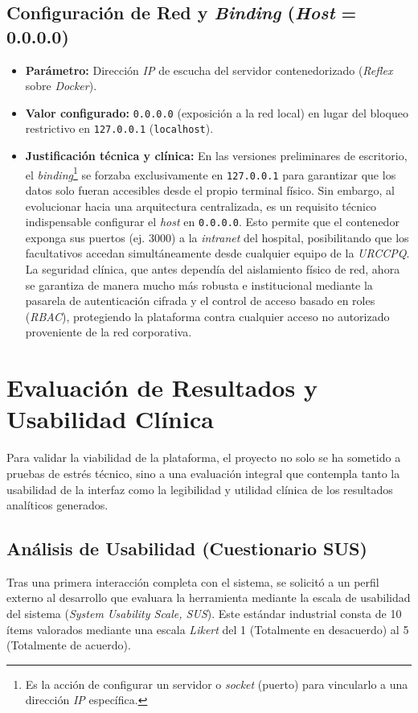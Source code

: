 \subsection{Configuración de Red y \textit{Binding} (\textit{Host} = 0.0.0.0)}
\begin{itemize}
    \item \textbf{Parámetro:} Dirección \textit{IP} de escucha del servidor contenedorizado (\textit{Reflex} sobre \textit{Docker}).
    \item \textbf{Valor configurado:} \texttt{0.0.0.0} (exposición a la red local) en lugar del bloqueo restrictivo en \texttt{127.0.0.1} (\texttt{localhost}).
    \item \textbf{Justificación técnica y clínica:} En las versiones preliminares de escritorio, el \textit{binding}\footnote{Es la acción de configurar un servidor o \textit{socket} (puerto) para vincularlo a una dirección \textit{IP} específica.} se forzaba exclusivamente en \texttt{127.0.0.1} para garantizar que los datos solo fueran accesibles desde el propio terminal físico. Sin embargo, al evolucionar hacia una arquitectura centralizada, es un requisito técnico indispensable configurar el \textit{host} en \texttt{0.0.0.0}. Esto permite que el contenedor exponga sus puertos (ej. 3000) a la \textit{intranet} del hospital, posibilitando que los facultativos accedan simultáneamente desde cualquier equipo de la \textit{URCCPQ}. La seguridad clínica, que antes dependía del aislamiento físico de red, ahora se garantiza de manera mucho más robusta e institucional mediante la pasarela de autenticación cifrada y el control de acceso basado en roles (\textit{RBAC}), protegiendo la plataforma contra cualquier acceso no autorizado proveniente de la red corporativa.
\end{itemize}

\section{Evaluación de Resultados y Usabilidad Clínica}
Para validar la viabilidad de la plataforma, el proyecto no solo se ha sometido a pruebas de estrés técnico, sino a una evaluación integral que contempla tanto la usabilidad de la interfaz como la legibilidad y utilidad clínica de los resultados analíticos generados.

\subsection{Análisis de Usabilidad (Cuestionario SUS)}
Tras una primera interacción completa con el sistema, se solicitó a un perfil externo al desarrollo que evaluara la herramienta mediante la escala de usabilidad del sistema (\textit{System Usability Scale, SUS}). Este estándar industrial consta de 10 ítems valorados mediante una escala \textit{Likert} del 1 (Totalmente en desacuerdo) al 5 (Totalmente de acuerdo).

